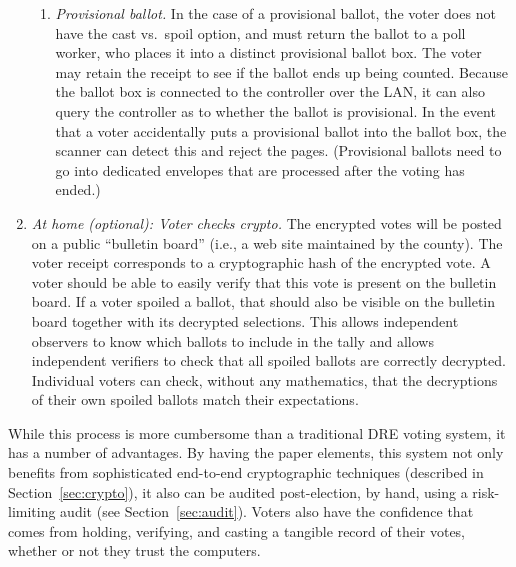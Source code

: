 \begin{enumerate}
\begin{enumerate}
\item {\em Provisional ballot.}
In the case of a provisional ballot, the voter does not have the cast
vs.~spoil option, and must return the ballot to a poll worker, who
places it into a distinct provisional ballot box. The voter may retain
the receipt to see if the ballot ends up being counted. Because the
ballot box is connected to the controller over the LAN, it can also
query the controller as to whether the ballot is provisional. In the
event that a voter accidentally puts a provisional ballot into the
ballot box, the scanner can detect this and reject the
pages. (Provisional ballots need to go into dedicated envelopes that
are processed after the voting has ended.)
\end{enumerate}

\item {\em At home (optional): Voter checks crypto.}
The encrypted votes will be posted on a public ``bulletin board''
 (i.e., a web site maintained by the county).
 The voter receipt corresponds to a cryptographic hash of the encrypted vote.
 A voter should be able to easily verify that this vote is present on the bulletin board.
 If a voter spoiled a ballot, that should also be visible on the bulletin board
 together with its decrypted selections.  
 This allows independent observers to
 know which ballots to include in the tally and allows independent verifiers
 to check that all spoiled ballots are correctly decrypted.  
 Individual voters can
 check, without any mathematics,
 that the decryptions of their own spoiled ballots match their expectations.
\end{enumerate}


While this process is more cumbersome than a traditional DRE voting
system, it has a number of advantages. By having the paper elements,
this system not only benefits from sophisticated end-to-end cryptographic
techniques (described in Section~\ref{sec:crypto}), it also can be
audited post-election, by hand, using a risk-limiting audit
(see Section~\ref{sec:audit}). 
Voters also have the confidence that
comes from holding, verifying, and casting a tangible record of their
votes, whether or not they trust the computers.


